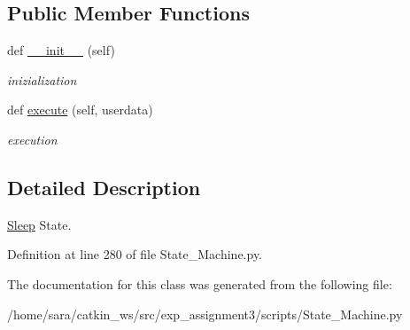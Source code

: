 \subsection*{Public Member Functions}
\begin{DoxyCompactItemize}
\item 
\mbox{\label{classState__Machine_1_1Sleep_a80fe4b057086e30543d48b465fb46e66}} 
def \hyperlink{classState__Machine_1_1Sleep_a80fe4b057086e30543d48b465fb46e66}{\+\_\+\+\_\+init\+\_\+\+\_\+} (self)
\begin{DoxyCompactList}\small\item\em inizialization \end{DoxyCompactList}\item 
\mbox{\label{classState__Machine_1_1Sleep_a7ab46952ff37e2c2a15e545df30149ff}} 
def \hyperlink{classState__Machine_1_1Sleep_a7ab46952ff37e2c2a15e545df30149ff}{execute} (self, userdata)
\begin{DoxyCompactList}\small\item\em execution \end{DoxyCompactList}\end{DoxyCompactItemize}


\subsection{Detailed Description}
\hyperlink{classState__Machine_1_1Sleep}{Sleep} State. 

Definition at line 280 of file State\+\_\+\+Machine.\+py.



The documentation for this class was generated from the following file\+:\begin{DoxyCompactItemize}
\item 
/home/sara/catkin\+\_\+ws/src/exp\+\_\+assignment3/scripts/State\+\_\+\+Machine.\+py\end{DoxyCompactItemize}
